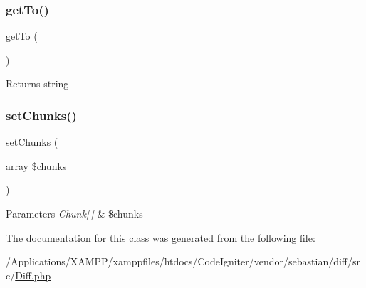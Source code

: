 \subsubsection{\texorpdfstring{get\+To()}{getTo()}}
{\footnotesize\ttfamily get\+To (\begin{DoxyParamCaption}{ }\end{DoxyParamCaption})}

\begin{DoxyReturn}{Returns}
string 
\end{DoxyReturn}
\mbox{\label{class_sebastian_bergmann_1_1_diff_1_1_diff_a9cc885382e8c61c7bf75b12ac08e9ce6}} 
\subsubsection{\texorpdfstring{set\+Chunks()}{setChunks()}}
{\footnotesize\ttfamily set\+Chunks (\begin{DoxyParamCaption}\item[{array}]{\$chunks }\end{DoxyParamCaption})}


\begin{DoxyParams}{Parameters}
{\em Chunk\mbox{[}$\,$\mbox{]}} & \$chunks \\
\hline
\end{DoxyParams}


The documentation for this class was generated from the following file\+:\begin{DoxyCompactItemize}
\item 
/\+Applications/\+X\+A\+M\+P\+P/xamppfiles/htdocs/\+Code\+Igniter/vendor/sebastian/diff/src/\mbox{\hyperlink{_diff_8php}{Diff.\+php}}\end{DoxyCompactItemize}
